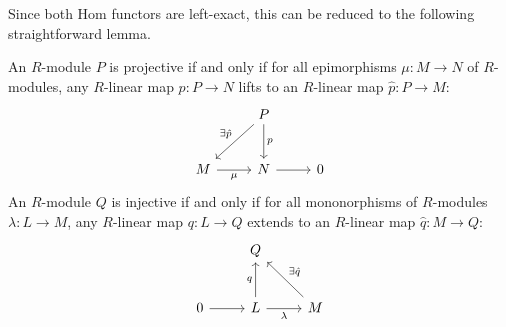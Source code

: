 Since both Hom functors are left-exact, this can be reduced to the following straightforward lemma.
\begin{lemma}\label{lma:8.11}
	An $R$-module $P$ is projective if and only if for all epimorphisms $\mu : M \to N$ of $R$-modules, any $R$-linear map $p : P \to N$ lifts to an $R$-linear map $\hat{p} : P \to M$:
	\[\begin{tikzcd}[row sep = 2.5em, column sep = 2.5em]
		&P\arrow[dl, "\exists  \hat{p} "']\arrow[d, "p"]\\
		M\arrow[r, "\mu "']&N\arrow[r]&0
	\end{tikzcd}\]
	An $R$-module $Q$ is injective if and only if for all mononorphisms of $R$-modules $\lambda : L \to M$, any $R$-linear map $q : L \to Q$ extends to an $R$-linear map $\hat{q} : M \to Q$:
	\[\begin{tikzcd}[row sep = 2.5em, column sep = 2.5em]
		&Q\\
		0\arrow[r]&L\arrow[r, "\lambda "']\arrow[u, "q"]&M\arrow[ul, "\exists \hat{q} "']
	\end{tikzcd}\]
\end{lemma}
